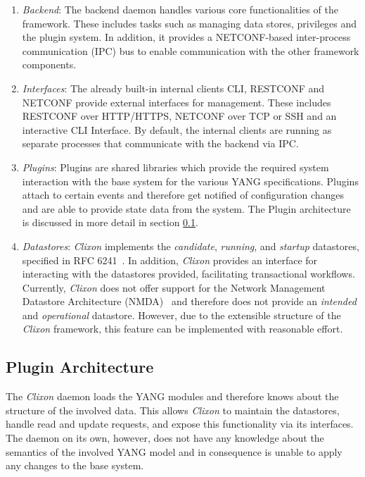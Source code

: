 \begin{enumerate}
    \item \textit{Backend}: The backend daemon handles various core functionalities of the framework. These includes tasks such as managing data stores, privileges and the plugin system. In addition, it provides a \mbox{NETCONF-based} inter-process communication (IPC) bus to enable communication with the other framework components.
    
    \item \textit{Interfaces}: The already built-in internal clients CLI, RESTCONF and NETCONF provide external interfaces for management. These includes RESTCONF over HTTP/HTTPS, NETCONF over TCP or SSH and an interactive CLI Interface. By default, the internal clients are running as separate processes that communicate with the backend via IPC.

    \item \textit{Plugins}: Plugins are shared libraries which provide the required system interaction with the base system for the various YANG specifications. Plugins attach to certain events and therefore get notified of configuration changes and are able to provide state data from the system. The Plugin architecture is discussed in more detail in section \ref{sec:clixon-framework_plugin-architecture}.

    \item \textit{Datastores}: \textit{Clixon} implements the \textit{candidate}, \textit{running}, and \textit{startup} datastores, specified in RFC 6241~\cite{RFC6241}. In addition, \textit{Clixon} provides an interface for interacting with the datastores provided, facilitating transactional workflows. Currently, \textit{Clixon} does not offer support for the Network Management Datastore Architecture (NMDA)~\cite{RFC8342} and therefore does not provide an \textit{intended} and \textit{operational} datastore. However, due to the extensible structure of the \textit{Clixon} framework, this feature can be implemented with reasonable effort.
\end{enumerate}


\subsection{Plugin Architecture}
\label{sec:clixon-framework_plugin-architecture}

The \textit{Clixon} daemon loads the YANG modules and therefore knows about the structure of the involved data. This allows \textit{Clixon} to maintain the datastores, handle read and update requests, and expose this functionality via its interfaces. The daemon on its own, however, does not have any knowledge about the semantics of the involved YANG model and in consequence is unable to apply any changes to the base system.

